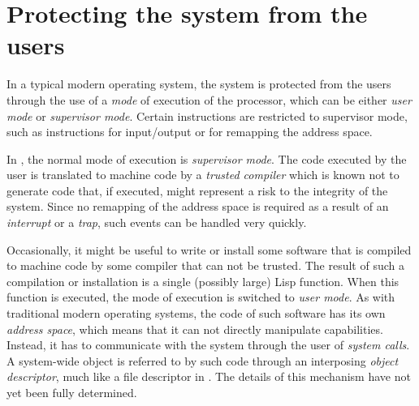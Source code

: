 \section{Protecting the system from the users}

In a typical modern operating system, the system is protected from the
users through the use of a \emph{mode} of execution of the processor,
which can be either \emph{user mode} or \emph{supervisor mode}.
Certain instructions are restricted to supervisor mode, such as
instructions for input/output or for remapping the address space. 

In \sysname{}, the normal mode of execution is \emph{supervisor mode}.
The code executed by the user is translated to machine code by a
\emph{trusted compiler} which is known not to generate code that, if
executed, might represent a risk to the integrity of the system.
Since no remapping of the address space is required as a result of an
\emph{interrupt} or a \emph{trap}, such events can be handled very
quickly. 

Occasionally, it might be useful to write or install some software
that is compiled to machine code by some compiler that can not be
trusted.  The result of such a compilation or installation is a single
(possibly large) Lisp function.  When this function is executed, the
mode of execution is switched to \emph{user mode}.  As with
traditional modern operating systems, the code of such software has
its own \emph{address space}, which means that it can not directly
manipulate \sysname{} capabilities.  Instead, it has to communicate
with the system through the user of \emph{system calls}.  A
system-wide object is referred to by such code through an interposing
\emph{object descriptor}, much like a file descriptor in \unix{}.  The
details of this mechanism have not yet been fully determined.



